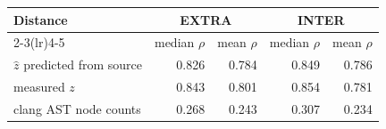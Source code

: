 \begin{tabular}{lrrrr}
\toprule
Distance & \multicolumn{2}{c}{EXTRA} & \multicolumn{2}{c}{INTER} \\
\cmidrule(lr){2-3}\cmidrule(lr){4-5}
 & median $\rho$ & mean $\rho$ & median $\rho$ & mean $\rho$ \\
\midrule
$\hat z$ predicted from source & 0.826 & 0.784 & 0.849 & 0.786 \\
measured $z$ & 0.843 & 0.801 & 0.854 & 0.781 \\
clang AST node counts & 0.268 & 0.243 & 0.307 & 0.234 \\
\bottomrule
\end{tabular}
